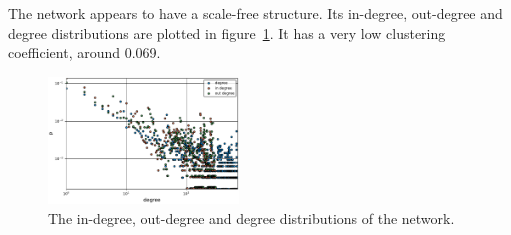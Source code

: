 The network appears to have a scale-free structure. Its in-degree, out-degree and degree
distributions are plotted in figure~\ref{fig:dist}. It has a very low clustering
coefficient, around 0.069.

\begin{figure}
  \includegraphics[width=0.45\textwidth]{../plots/degree}
  \caption{The in-degree, out-degree and degree distributions of the network.}
  \label{fig:dist}
\end{figure}

